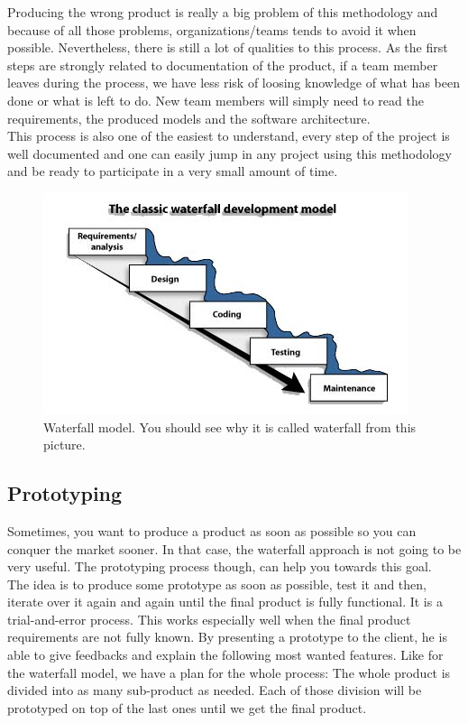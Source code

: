 \documentclass[12pt]{article}
\theoremstyle{definition}
\theoremstyle{definition}
\begin{document}
Producing the wrong product is really a big problem of this methodology and because of all those problems, organizations/teams tends to avoid it when possible. Nevertheless, there is still a lot of qualities to this process. As the first steps are strongly related to documentation of the product, if a team member leaves during the process, we have less risk of loosing knowledge of what has been done or what is left to do. New team members will simply need to read the requirements, the produced models and the software architecture.\\

This process is also one of the easiest to understand, every step of the project is well documented and one can easily jump in any project using this methodology and be ready to participate in a very small amount of time.\\

\begin{figure}
    \centering
    \includegraphics[scale=0.8]{waterfall.jpg}
    \caption{Waterfall model. You should see why it is called waterfall from this picture.}
    \label{Waterfall}
\end{figure}

\subsection{Prototyping}

Sometimes, you want to produce a product as soon as possible so you can conquer the market sooner. In that case, the waterfall approach is not going to be very useful. The prototyping process though, can help you towards this goal.\\

The idea is to produce some prototype as soon as possible, test it and then, iterate over it again and again until the final product is fully functional. It is a trial-and-error process. This works especially well when the final product requirements are not fully known. By presenting a prototype to the client, he is able to give feedbacks and explain the following most wanted features. Like for the waterfall model, we have a plan for the whole process: The whole product is divided into as many sub-product as needed. Each of those division will be prototyped on top of the last ones until we get the final product.\\
\end{document}

